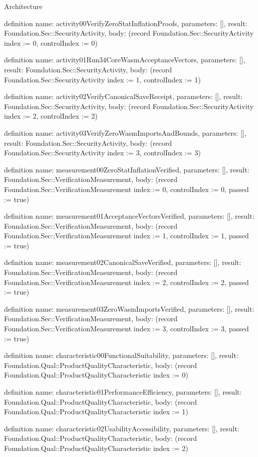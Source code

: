 \begin{lexlean}{Architecture}
\begin{semanticmodule}
definition{
  name: activity00VerifyZeroStatInflationProofs,
  parameters: [],
  result: Foundation.Sec::SecurityActivity,
  body: (record Foundation.Sec::SecurityActivity {index := 0, controlIndex := 0})
}

definition{
  name: activity01Run34CoreWasmAcceptanceVectors,
  parameters: [],
  result: Foundation.Sec::SecurityActivity,
  body: (record Foundation.Sec::SecurityActivity {index := 1, controlIndex := 1})
}

definition{
  name: activity02VerifyCanonicalSaveReceipt,
  parameters: [],
  result: Foundation.Sec::SecurityActivity,
  body: (record Foundation.Sec::SecurityActivity {index := 2, controlIndex := 2})
}

definition{
  name: activity03VerifyZeroWasmImportsAndBounds,
  parameters: [],
  result: Foundation.Sec::SecurityActivity,
  body: (record Foundation.Sec::SecurityActivity {index := 3, controlIndex := 3})
}

definition{
  name: measurement00ZeroStatInflationVerified,
  parameters: [],
  result: Foundation.Sec::VerificationMeasurement,
  body: (record Foundation.Sec::VerificationMeasurement {index := 0, controlIndex := 0, passed := true})
}

definition{
  name: measurement01AcceptanceVectorsVerified,
  parameters: [],
  result: Foundation.Sec::VerificationMeasurement,
  body: (record Foundation.Sec::VerificationMeasurement {index := 1, controlIndex := 1, passed := true})
}

definition{
  name: measurement02CanonicalSaveVerified,
  parameters: [],
  result: Foundation.Sec::VerificationMeasurement,
  body: (record Foundation.Sec::VerificationMeasurement {index := 2, controlIndex := 2, passed := true})
}

definition{
  name: measurement03ZeroWasmImportsVerified,
  parameters: [],
  result: Foundation.Sec::VerificationMeasurement,
  body: (record Foundation.Sec::VerificationMeasurement {index := 3, controlIndex := 3, passed := true})
}

definition{
  name: characteristic00FunctionalSuitability,
  parameters: [],
  result: Foundation.Qual::ProductQualityCharacteristic,
  body: (record Foundation.Qual::ProductQualityCharacteristic {index := 0})
}

definition{
  name: characteristic01PerformanceEfficiency,
  parameters: [],
  result: Foundation.Qual::ProductQualityCharacteristic,
  body: (record Foundation.Qual::ProductQualityCharacteristic {index := 1})
}

definition{
  name: characteristic02UsabilityAccessibility,
  parameters: [],
  result: Foundation.Qual::ProductQualityCharacteristic,
  body: (record Foundation.Qual::ProductQualityCharacteristic {index := 2})
}


\end{semanticmodule}
\end{lexlean}
